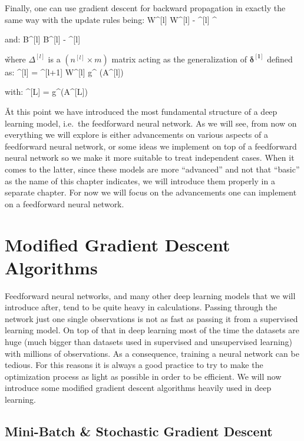 Finally, one can use gradient descent for backward propagation in exactly the same way with the update rules being:
\bse
W^{[l]} \coloneqq W^{[l]} - \alpha \cdot \Delta^{[l]} ^{\intercal}
\ese

and:
\bse
B^{[l]} \coloneqq B^{[l]} - \alpha \cdot \Delta^{[l]}
\ese

\v

where $\Delta^{[l]}$ is a $(n^{[l]} \times m)$ matrix acting as the generalization of $\boldsymbol{\delta^{[l]}}$
defined as:
\bse
\Delta^{[l]} = \Delta^{[l+1]} \cdot W^{[l]} \cdot g^{\prime} (A^{[l]})
\ese

with:
\bse
\Delta^{[L]} =  \cdot g^\prime (A^{[L]})
\ese

\v

At this point we have introduced the most fundamental structure of a deep learning model, i.e.\ the feedforward
neural network. As we will see, from now on everything we will explore is either advancements on various aspects of a
feedforward neural network, or some ideas we implement on top of a feedforward neural network so we make it more
suitable to treat independent cases. When it comes to the latter, since these models are more ``advanced'' and not
that ``basic'' as the name of this chapter indicates, we will introduce them properly in a separate chapter. For now
we will focus on the advancements one can implement on a feedforward neural network.

\section{Modified Gradient Descent Algorithms}

Feedforward neural networks, and many other deep learning models that we will introduce after, tend to be quite heavy
in calculations. Passing through the network just one single observations is not as fast as passing it from a
supervised learning model. On top of that in deep learning most of the time the datasets are huge (much bigger than
datasets used in supervised and unsupervised learning) with millions of observations. As a consequence, training a
neural network can be tedious. For this reasons it is always a good practice to try to make the optimization process
as light as possible in order to be efficient. We will now introduce some modified gradient descent algorithms
heavily used in deep learning.

\subsection{Mini-Batch \& Stochastic Gradient Descent}

